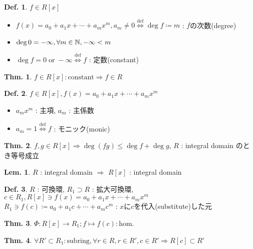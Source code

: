 \documentclass[uplatex,dvipdfmx,9pt]{beamer}
\newcommand{\defarrow}{\overset{\mathrm{def}}{\Leftrightarrow}}
\newcommand{\lt}{\ensuremath <}
\renewcommand{\hom}{\text{hom.}} %
\newcommand{\N}{\mathbb{N}}
\newcounter{textLemCount}
\theoremstyle{definition} %
\newtheorem{defn}{Def.}[subsection] %
\newtheorem{thm}{Thm.}[subsection] %
\newtheorem{lemText}[textLemCount]{Lem.} %
\theoremstyle{example}
\begin{document}
\begin{frame}

  \begin{defn}
    $f \in R[x]$
    \begin{itemize}
      \item $f(x) = a_0 + a_1 x + \cdots + a_m x^m, a_m \neq 0 \defarrow \deg f \coloneqq m$ : $f$の\alert{次数(degree)}
      \item $\deg 0 = - \infty, \forall m \in \N, - \infty \lt m$
      \item $\deg f = 0 \; \text{or} \; - \infty \defarrow f$ : \alert{定数(constant)}
    \end{itemize}
  \end{defn}

  \begin{thm}
    $f \in R[x] : \text{constant} \Rightarrow f \in R$
  \end{thm}

  \begin{defn}
    $f \in R[x], f(x) = a_0 + a_1 x + \cdots + a_m x^m$
    \begin{itemize}
      \item $a_m x^m$ : \alert{主項}, $a_m$ : \alert{主係数}
      \item $a_m = 1 \defarrow f$ : \alert{モニック(monic)}
    \end{itemize}
  \end{defn}

\end{frame}

\begin{frame}

  \begin{thm}
    $f, g \in R[x] \Rightarrow \deg (fg) \le \deg f + \deg g$, $R$ : integral domain のとき等号成立
  \end{thm}

  \begin{lemText}
    $R$ : integral domain $\Rightarrow$ $R[x]$ : integral domain
  \end{lemText}

  \begin{defn}
    $R$ : 可換環, $R_1 \supset R$ : 拡大可換環, $ c \in R_1, R[x] \ni f(x) = a_0 + a_1 x + \cdots + a_m x^m$ \\
    $R_1 \ni f(c) \coloneqq a_0 + a_1 c + \cdots + a_m c^m$ : $x$に$c$を\alert{代入(substitute)}した元
  \end{defn}

  \begin{thm}
    $\Phi\colon R[x] \to R_1; f \mapsto f(c) : \hom$
  \end{thm}

  \begin{thm}
    $\forall R' \subset R_1 : \text{subring}, \forall r \in R, r \in R', c \in R' \Rightarrow R[c] \subset R'$
  \end{thm}

\end{frame}
\end{document}
